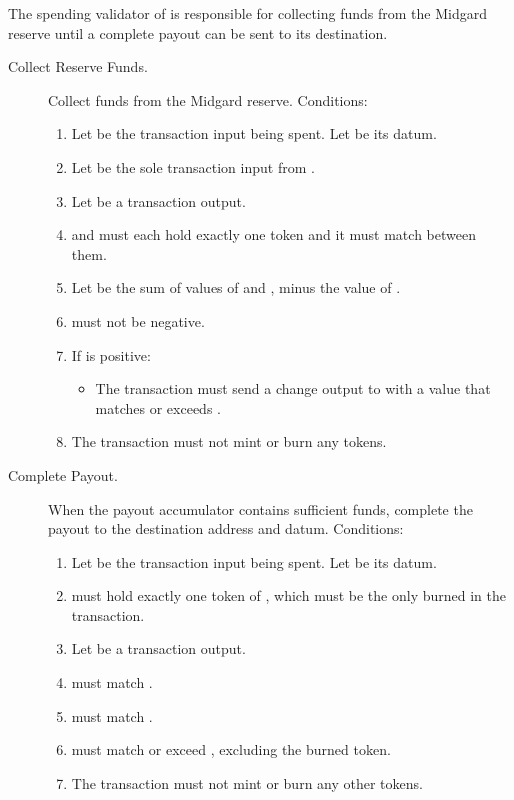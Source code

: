 \documentclass[../midgard.tex]{subfiles}
\begin{document}
The spending validator of  is responsible for collecting funds from the Midgard reserve until a complete payout can be sent to its destination.
\begin{description}
  \item[Collect Reserve Funds.] Collect funds from the Midgard reserve.
    Conditions:
    \begin{enumerate}
      \item Let  be the transaction input being spent.
        Let  be its datum.
      \item Let  be the sole transaction input from .
      \item Let  be a transaction output.
      \item {} and  must each hold exactly one  token and it must match between them.
      \item Let  be the sum of values of  and , minus the value of .
      \item {} must not be negative.
      \item If  is positive:
        \begin{itemize}
          \item The transaction must send a change output to  with a value that matches or exceeds .
        \end{itemize}
      \item The transaction must not mint or burn any tokens.
    \end{enumerate}
  \item[Complete Payout.] When the payout accumulator contains sufficient funds, complete the payout to the destination address and datum.
    Conditions:
    \begin{enumerate}
      \item Let  be the transaction input being spent.
        Let  be its datum.
      \item {} must hold exactly one token of , which must be the only  burned in the transaction.
      \item Let  be a transaction output.
      \item {} must match .
      \item {} must match .
      \item {} must match or exceed , excluding the burned token.
      \item The transaction must not mint or burn any other tokens.
    \end{enumerate}
\end{description}
\end{document}
